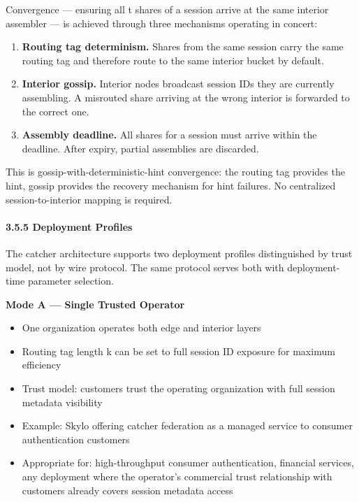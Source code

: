 \documentclass[
  11pt,
]{article}
\providecommand{\tightlist}{%
  \setlength{\itemsep}{0pt}\setlength{\parskip}{0pt}}
\begin{document}
Convergence --- ensuring all t shares of a session arrive at the same
interior assembler --- is achieved through three mechanisms operating in
concert:

\begin{enumerate}
\def\labelenumi{\arabic{enumi}.}
\tightlist
\item
  \textbf{Routing tag determinism.} Shares from the same session carry
  the same routing tag and therefore route to the same interior bucket
  by default.
\item
  \textbf{Interior gossip.} Interior nodes broadcast session IDs they
  are currently assembling. A misrouted share arriving at the wrong
  interior is forwarded to the correct one.
\item
  \textbf{Assembly deadline.} All shares for a session must arrive
  within the deadline. After expiry, partial assemblies are discarded.
\end{enumerate}

This is gossip-with-deterministic-hint convergence: the routing tag
provides the hint, gossip provides the recovery mechanism for hint
failures. No centralized session-to-interior mapping is required.

\hypertarget{deployment-profiles}{%
\paragraph{3.5.5 Deployment Profiles}\label{deployment-profiles}}

The catcher architecture supports two deployment profiles distinguished
by trust model, not by wire protocol. The same protocol serves both with
deployment-time parameter selection.

\textbf{Mode A --- Single Trusted Operator}

\begin{itemize}
\tightlist
\item
  One organization operates both edge and interior layers
\item
  Routing tag length k can be set to full session ID exposure for
  maximum efficiency
\item
  Trust model: customers trust the operating organization with full
  session metadata visibility
\item
  Example: Skylo offering catcher federation as a managed service to
  consumer authentication customers
\item
  Appropriate for: high-throughput consumer authentication, financial
  services, any deployment where the operator's commercial trust
  relationship with customers already covers session metadata access
\end{itemize}
\end{document}
